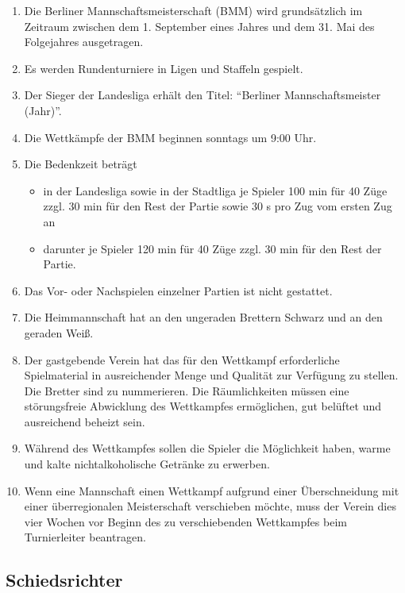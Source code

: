 \documentclass[fontsize=12pt, paper=a4, ngerman]{article}
\begin{document}
\begin{enumerate}
\item Die Berliner Mannschaftsmeisterschaft (BMM) wird grundsätzlich im Zeitraum zwischen dem 1. September eines Jahres und dem 31. Mai des Folgejahres ausgetragen.
\item Es werden Rundenturniere in Ligen und Staffeln gespielt.
\item Der Sieger der Landesliga erhält den Titel: "`Berliner Mannschaftsmeister (Jahr)"'.
\item Die Wettkämpfe der BMM beginnen sonntags um 9:00 Uhr.
\item Die Bedenkzeit beträgt
  \begin{itemize}
  \item in der Landesliga sowie in der Stadtliga je Spieler 100 min für 40 Züge zzgl. 30 min für den Rest der Partie sowie 30 s pro Zug vom ersten Zug an
  \item darunter je Spieler 120 min für 40 Züge zzgl. 30 min für den Rest der Partie.
  \end{itemize}
\item Das Vor- oder Nachspielen einzelner Partien ist nicht gestattet.
\item Die Heimmannschaft hat an den ungeraden Brettern Schwarz und an den geraden Weiß.
\item Der gastgebende Verein hat das für den Wettkampf erforderliche Spielmaterial in ausreichender Menge und Qualität zur Verfügung zu stellen.
Die Bretter sind zu nummerieren. Die Räumlichkeiten müssen eine störungsfreie Abwicklung des Wettkampfes ermöglichen, gut belüftet und ausreichend beheizt sein.
\item Während des Wettkampfes sollen die Spieler die Möglichkeit haben, warme und kalte nichtalkoholische Getränke zu erwerben.
\item Wenn eine Mannschaft einen Wettkampf aufgrund einer Überschneidung mit einer überregionalen Meisterschaft verschieben möchte, muss der Verein dies vier Wochen
vor Beginn des zu verschiebenden Wettkampfes beim Turnierleiter beantragen.
\end{enumerate}

\subsection{Schiedsrichter}
\end{document}
